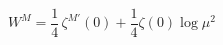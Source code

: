 \begin{equation}
\label{effact}
W^M=\frac{1}{4}\,\zeta^{M\prime}(0)+\frac{1}{4} \zeta(0) \log \mu^2
\end{equation}

